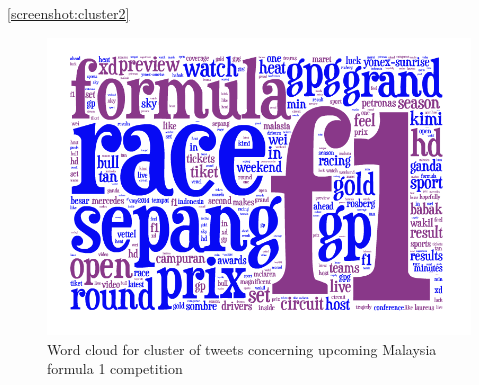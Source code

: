 \documentclass{acm_proc_10ptArticle-sp}
\begin{document}
\ref{screenshot:cluster2}
\begin{figure}[H]
  \centering
  \includegraphics[width=0.9\linewidth]{img/cluster2.png}
  \caption{Word cloud for cluster of tweets concerning upcoming Malaysia formula 1 competition}
  \label{screenshot:limitation}
\end{figure}






\end{document}
